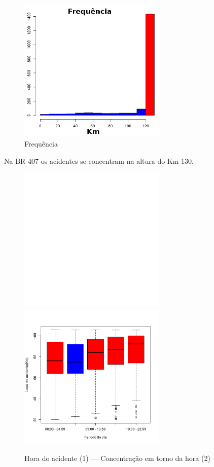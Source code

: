\quad
\begin{figure}[h]
	\centering
	\caption{ Frequência}
	\includegraphics[width=7cm,height=7cm]{Figuras/Preprocess/br407_2.png}
\end{figure}

Na BR 407 os acidentes se concentram na altura do Km
130.



\begin{figure}[h]
	\caption{Hora do acidente (1) --- Concentração em torno da hora (2)}
	\includegraphics[width=7cm,height=7cm]{Figuras/Preprocess/br408_1.png}
	\includegraphics[width=7cm,height=7cm]{Figuras/Preprocess/br408_2.png}

\end{figure}

